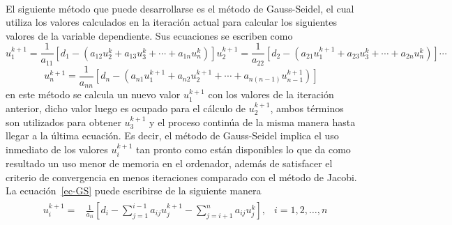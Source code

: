 \documentclass[letterpaper, openright, 12pt]{book}
\begin{document}
    \paragraph*{}
        El siguiente método que puede desarrollarse es el método de Gauss-Seidel,
        el cual utiliza los valores calculados en la iteración actual para
        calcular los siguientes valores de la variable dependiente. Sus
        ecuaciones se escriben como
        \begin{subequations}
            \begin{equation*}
                u_{1}^{k+1} = \frac{1}{a_{11}} \left[ d_{1} - \left( a_{12}u_{2}^{k} + a_{13}u_{3}^{k} + \dotsb + a_{1n}u_{n}^k \right) \right]
            \end{equation*}
            \begin{equation*}
                u_{2}^{k+1} = \frac{1}{a_{22}} \left[ d_{2} - \left( a_{21}u_{1}^{k+1} + a_{23}u_{3}^{k} + \dotsb + a_{2n}u_{n}^{k} \right) \right]
            \end{equation*}
            \begin{equation*}
                \dotsb
            \end{equation*}
        \end{subequations}
        \begin{equation}
            u_{n}^{k+1} = \frac{1}{a_{nn}} \left[ d_{n} - \left( a_{n1}u_{1}^{k+1} + a_{n2}u_{2}^{k+1} + \dotsb + a_{n\left( n-1 \right)}u_{n-1}^{k+1} \right) \right]
            \label{ec-GS}
        \end{equation}
        en este método se calcula un nuevo valor $u_{1}^{k+1}$ con los valores
        de la iteración anterior, dicho valor luego es ocupado para
        el cálculo de $u_{2}^{k+1}$, ambos términos son utilizados para obtener
        $u_{3}^{k+1}$ y el proceso continúa de la misma manera hasta llegar a la
        última ecuación. Es decir, el método de Gauss-Seidel implica el uso
        inmediato de los valores $u_{i}^{k+1}$ tan pronto como están disponibles
        lo que da como resultado un uso menor de memoria en el ordenador, además
        de satisfacer el criterio de convergencia en menos iteraciones comparado
        con el método de Jacobi. La ecuación~\ref{ec-GS} puede escribirse de la
        siguiente manera
        \begin{align}
            &\begin{aligned}
                u_{i}^{k+1} =& \frac{1}{a_{ii}} \left[ d_{i} - \sum_{j=1}^{i-1} a_{ij}u_{j}^{k+1}  - \sum_{j = i + 1}^{n} a_{ij}u_{j}^{k} \right], &i = 1, 2, \dotsc, n
            \end{aligned}
            \label{ec-GS-2}
        \end{align}
\end{document}
